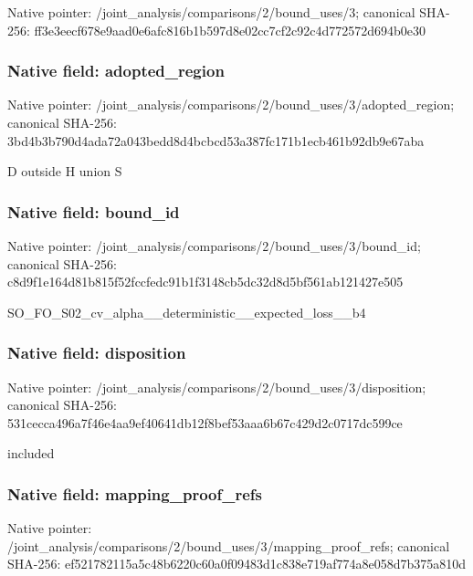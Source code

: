 \documentclass[10pt,a4paper]{article}
\begin{document}
Native pointer: /joint\_analysis/comparis\allowbreak{}ons/2/bound\_uses/3; canonical SHA-256: ff3e3eecf678e9aad0e6afc8\allowbreak{}16b1b597d8e02cc7cf2c92c4\allowbreak{}d772572d694b0e30



\subsubsection{Native field: adopted\_region}


Native pointer: /joint\_analysis/comparis\allowbreak{}ons/2/bound\_uses/3/adopt\allowbreak{}ed\_region; canonical SHA-256: 3bd4b3b790d4ada72a043bed\allowbreak{}d8d4bcbcd53a387fc171b1ec\allowbreak{}b461b92db9e67aba


D outside H union S


\subsubsection{Native field: bound\_id}


Native pointer: /joint\_analysis/comparis\allowbreak{}ons/2/bound\_uses/3/bound\allowbreak{}\_id; canonical SHA-256: c8d9f1e164d81b815f52fccf\allowbreak{}edc91b1f3148cb5dc32d8d5b\allowbreak{}f561ab121427e505


SO\_FO\_S02\_cv\_alpha\_\_dete\allowbreak{}rministic\_\_expected\_loss\allowbreak{}\_\_b4


\subsubsection{Native field: disposition}


Native pointer: /joint\_analysis/comparis\allowbreak{}ons/2/bound\_uses/3/dispo\allowbreak{}sition; canonical SHA-256: 531cecca496a7f46e4aa9ef4\allowbreak{}0641db12f8bef53aaa6b67c4\allowbreak{}29d2c0717dc599ce


included


\subsubsection{Native field: mapping\_proof\_refs}


Native pointer: /joint\_analysis/comparis\allowbreak{}ons/2/bound\_uses/3/mappi\allowbreak{}ng\_proof\_refs; canonical SHA-256: ef521782115a5c48b6220c60\allowbreak{}a0f09483d1c838e719af774a\allowbreak{}8e058d7b375a810d
\end{document}
